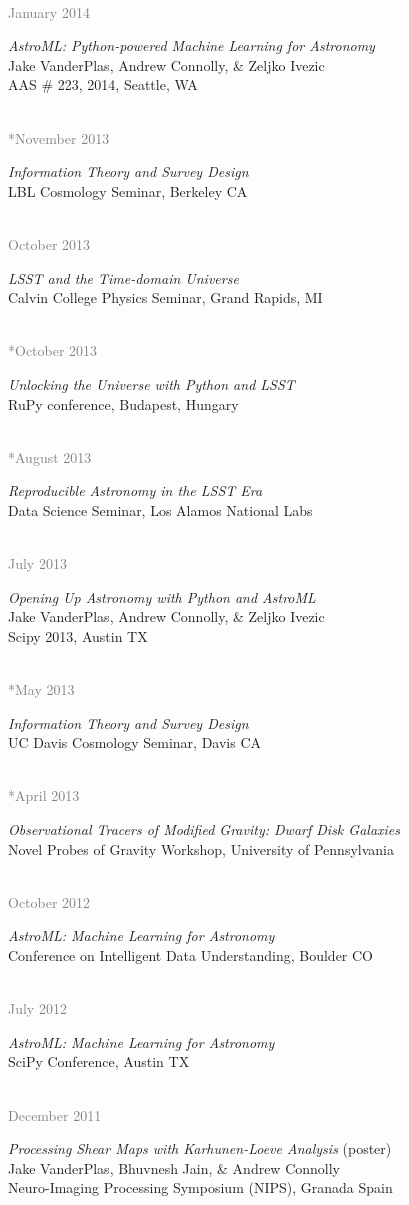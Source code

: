\documentclass{article} %
\newlength\sidebarwidth
\newcommand{\dateonly}[2][]
	 {\begin{minipage}{\textwidth}
	 \vspace*{.4\baselineskip}
         \nopagebreak\hspace{0in}%
         \nopagebreak\begin{minipage}[t]{\sidebarwidth - .2cm}
         \raggedleft {~}
         {\\[-\baselineskip] \textcolor{gray}{\footnotesize #1}}
	 \end{minipage}%
	 \hfill
	 \begin{minipage}[t]{\linewidth - \sidebarwidth}
	 #2%
	 \end{minipage}%
	 \vspace*{.2\baselineskip plus 1\baselineskip minus
	 .2\baselineskip}%
	 \end{minipage}}
\begin{document}
  \dateonly[January 2014]{
    {\it AstroML: Python-powered Machine Learning for Astronomy}\\
    Jake VanderPlas, Andrew Connolly, \& Zeljko Ivezic\\
    AAS \# 223, 2014, Seattle, WA
  }

  \dateonly[**November 2013]{
    {\it Information Theory and Survey Design}\\
    LBL Cosmology Seminar, Berkeley CA
  }

  \dateonly[October 2013]{
    {\it LSST and the Time-domain Universe}\\
    Calvin College Physics Seminar, Grand Rapids, MI
  }

  \dateonly[**October 2013]{
    {\it Unlocking the Universe with Python and LSST}\\
    RuPy conference, Budapest, Hungary
  }

  \dateonly[**August 2013]{
    {\it Reproducible Astronomy in the LSST Era}\\
    Data Science Seminar, Los Alamos National Labs
  }

  \dateonly[July 2013]{
    {\it Opening Up Astronomy with Python and AstroML}\\
    Jake VanderPlas, Andrew Connolly, \& Zeljko Ivezic\\
    Scipy 2013, Austin TX
  }

  \dateonly[**May 2013]{
    {\it Information Theory and Survey Design}\\
    UC Davis Cosmology Seminar, Davis CA
  }

  \dateonly[**April 2013]{
    {\it Observational Tracers of Modified Gravity: Dwarf Disk Galaxies}\\
    Novel Probes of Gravity Workshop, University of Pennsylvania
  }

  \dateonly[October 2012]{
    {\it AstroML: Machine Learning for Astronomy}\\
    Conference on Intelligent Data Understanding, Boulder CO
  }

  \dateonly[July 2012]{
    {\it AstroML: Machine Learning for Astronomy}\\
    SciPy Conference, Austin TX
  }

  \dateonly[December 2011]{
    {\it Processing Shear Maps with Karhunen-Loeve Analysis} (poster)\\
    Jake VanderPlas, Bhuvnesh Jain, \& Andrew Connolly\\
    Neuro-Imaging Processing Symposium (NIPS), Granada Spain
  }
\end{document}
